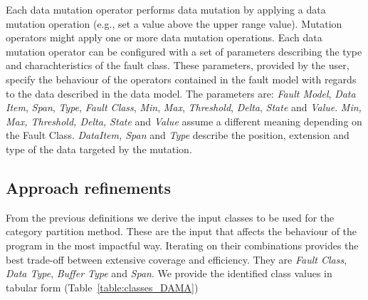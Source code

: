 

Each data mutation operator performs data mutation by applying a data mutation operation (e.g., set a value above the upper range value).
Mutation operators might apply one or more data mutation operations.
Each data mutation operator can be configured with a set of parameters describing the type and charachteristics of the fault class. These parameters, provided by the user, specify the behaviour of the operators contained in the fault model with regards to the data described in the data model.
The parameters are: \emph{Fault Model}, \emph{Data Item}, \emph{Span}, \emph{Type}, \emph{Fault Class}, \emph{Min}, \emph{Max}, \emph{Threshold}, \emph{Delta}, \emph{State} and \emph{Value}.
\emph{Min, Max, Threshold, Delta, State} and \emph{Value} assume a different meaning depending on the Fault Class.
\emph{DataItem, Span} and \emph{Type} describe the position, extension and type of the data targeted by the mutation.

\clearpage

\subsection{Approach refinements}

%
%
%
% 
%
% 

From the previous definitions we derive the input classes to be used for the category partition method.
These are the input that affects the behaviour of the program in the most impactful way.
Iterating on their combinations provides the best trade-off between extensive coverage and efficiency.
They are \emph{Fault Class}, \emph{Data Type}, \emph{Buffer Type} and \emph{Span}.
We provide the identified class values in tabular form (Table~\ref{table:classes_DAMA})


